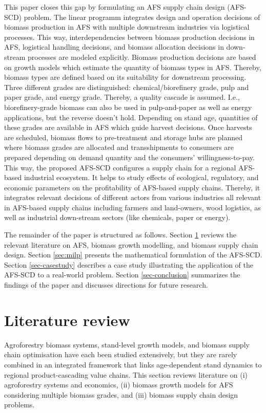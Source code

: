 \documentclass[APA,TimesLARGE]{WileyNJDv5} %
\renewcommand{\problem}{AFS-SCD}
\newcommand{\problemm}{AFS-SCD }
\begin{document}
This paper closes this gap by formulating an AFS supply chain design (\problem) problem. The linear programm integrates design and operation decisions of biomass production in AFS with multiple downstream industries via logistical processes. This way, interdependencies between biomass production decisions in AFS, logistical handling decisions, and biomass allocation decisions in down-stream processes are modeled explicitly. Biomass production decisions are based on growth models which estimate the quantity of biomass types in AFS. Thereby, biomass types are defined based on its suitability for downstream processing. Three different grades are distinguished: chemical/biorefinery grade, pulp and paper grade, and
energy grade. Thereby, a quality cascade is assumed. I.e., biorefinery-grade biomass can also be used in pulp-and-paper as well as energy applications, but the reverse doesn't hold. Depending on stand age, quantities of these grades are available in AFS which guide harvest decisions. Once harvests are scheduled, biomass flows to pre-treatment and storage hubs are planned where biomass grades are allocated and transshipments to consumers are prepared depending on demand quantity and the consumers' willingness-to-pay. This way, the proposed \problemm configures a supply chain for a regional AFS-based industrial ecosystem. It helps to study effects of ecological, regulatory, and economic parameters on the profitability of AFS-based supply chains. Thereby, it integrates relevant decisions of different actors from various industries all relevant in AFS-based supply chains including farmers and land-owners, wood logistics, as well as industrial down-stream sectors (like chemicals, paper or energy).

The remainder of the paper is structured as follows. Section \ref{sec:litreview} reviews the relevant literature on AFS, biomass growth modelling, and biomass supply chain design. Section \ref{sec:milp} presents the mathematical formulation of the AFS-SCD. Section \ref{sec-casestudy} describes a case study illustrating the application of the \problemm to a real-world problem. Section \ref{sec-conclusion} summarizes the findings of the paper and discusses directions for future research.

\section{Literature review}\label{sec:litreview}

Agroforestry biomass systems, stand-level growth models, and biomass supply chain optimisation have each been studied extensively, but they are rarely combined in an integrated framework that links age-dependent stand dynamics to regional product-cascading value chains. This section reviews literature on (i) agroforestry systems and economics, (ii) biomass growth models for AFS considering multiple biomass grades, and (iii) biomass supply chain design problems.
\end{document}
